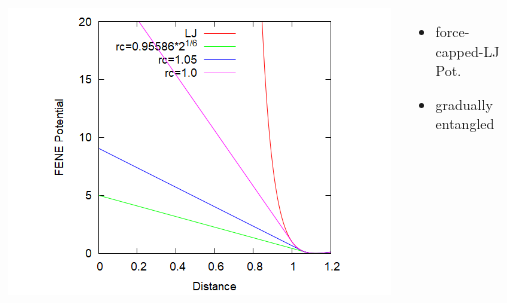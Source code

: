 \documentclass[12pt, dvipdfmx]{beamer}
\begin{document}
\begin{frame}
\begin{columns}[T, onlytextwidth]
\begin{center}
					\includegraphics[width=1.2\textwidth]{Ev_fcLJ.png}
				\end{center}
				\vspace{-3mm}
				\scriptsize
				\begin{itemize}
					\item force-capped-LJ Pot.
					\item gradually entangled
				\end{itemize}
		\end{columns}
\end{frame}
\end{document}
